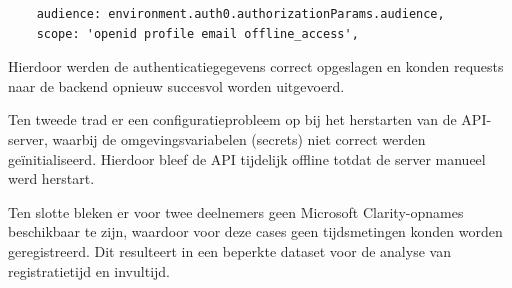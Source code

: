 \begin{verbatim}
    audience: environment.auth0.authorizationParams.audience,
    scope: 'openid profile email offline_access',
\end{verbatim}

Hierdoor werden de authenticatiegegevens correct opgeslagen en konden requests naar de backend opnieuw succesvol worden uitgevoerd.
\medskip

Ten tweede trad er een configuratieprobleem op bij het herstarten van de API-server, waarbij de omgevingsvariabelen (secrets) niet correct werden geïnitialiseerd. 
Hierdoor bleef de API tijdelijk offline totdat de server manueel werd herstart.
\medskip

Ten slotte bleken er voor twee deelnemers geen Microsoft Clarity-opnames beschikbaar te zijn, waardoor voor deze cases geen tijdsmetingen konden worden geregistreerd. 
Dit resulteert in een beperkte dataset voor de analyse van registratietijd en invultijd.